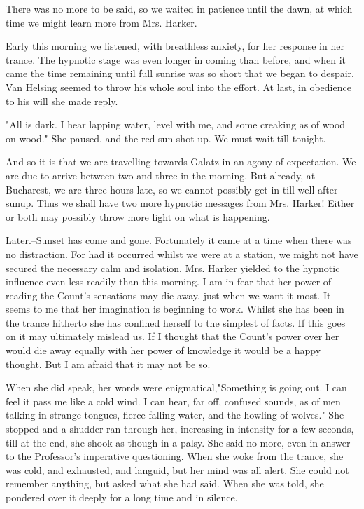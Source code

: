There was no more to be said, so we waited in patience until the dawn, at which time we might learn more from Mrs. Harker. 

Early this morning we listened, with breathless anxiety, for her response in her trance. The hypnotic stage was even longer in coming than before, and when it came the time remaining until full sunrise was so short that we began to despair. Van Helsing seemed to throw his whole soul into the effort. At last, in obedience to his will she made reply. 

"All is dark. I hear lapping water, level with me, and some creaking as of wood on wood." She paused, and the red sun shot up. We must wait till tonight. 

And so it is that we are travelling towards Galatz in an agony of expectation. We are due to arrive between two and three in the morning. But already, at Bucharest, we are three hours late, so we cannot possibly get in till well after sunup. Thus we shall have two more hypnotic messages from Mrs. Harker! Either or both may possibly throw more light on what is happening. 

Later.--Sunset has come and gone. Fortunately it came at a time when there was no distraction. For had it occurred whilst we were at a station, we might not have secured the necessary calm and isolation. Mrs. Harker yielded to the hypnotic influence even less readily than this morning. I am in fear that her power of reading the Count's sensations may die away, just when we want it most. It seems to me that her imagination is beginning to work. Whilst she has been in the trance hitherto she has confined herself to the simplest of facts. If this goes on it may ultimately mislead us. If I thought that the Count's power over her would die away equally with her power of knowledge it would be a happy thought. But I am afraid that it may not be so. 

When she did speak, her words were enigmatical,"Something is going out. I can feel it pass me like a cold wind. I can hear, far off, confused sounds, as of men talking in strange tongues, fierce falling water, and the howling of wolves." She stopped and a shudder ran through her, increasing in intensity for a few seconds, till at the end, she shook as though in a palsy. She said no more, even in answer to the Professor's imperative questioning. When she woke from the trance, she was cold, and exhausted, and languid, but her mind was all alert. She could not remember anything, but asked what she had said. When she was told, she pondered over it deeply for a long time and in silence. 

